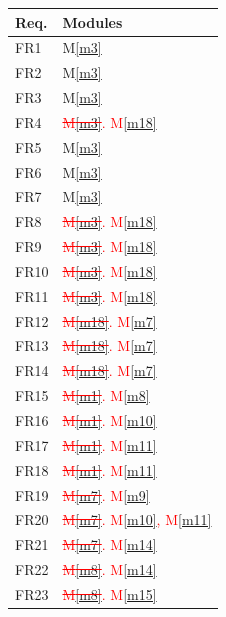 \documentclass[12pt, titlepage]{article}
\newcommand{\mref}[1]{M\ref{#1}}
\begin{document}
\begin{table}[H]
	\centering
	\begin{tabular}{p{} p{}}
		\toprule
		\textbf{Req.} & \textbf{Modules}\\
		\midrule
		FR1 & \mref{m3}\\
		FR2 & \mref{m3}\\
		FR3 & \mref{m3}\\
		FR4 & \textcolor{red}{\sout{\mref{m3}}}\textcolor{red}{. \mref{m18}}\\
		FR5 & \mref{m3}\\
		FR6 & \mref{m3}\\
		FR7 & \mref{m3}\\
		FR8 & \textcolor{red}{\sout{\mref{m3}}}\textcolor{red}{. \mref{m18}}\\
		FR9 & \textcolor{red}{\sout{\mref{m3}}}\textcolor{red}{. \mref{m18}}\\
		FR10 & \textcolor{red}{\sout{\mref{m3}}}\textcolor{red}{. \mref{m18}}\\
		FR11 & \textcolor{red}{\sout{\mref{m3}}}\textcolor{red}{. \mref{m18}}\\
		FR12 & \textcolor{red}{\sout{\mref{m18}}}\textcolor{red}{. \mref{m7}}\\
		FR13 & \textcolor{red}{\sout{\mref{m18}}}\textcolor{red}{. \mref{m7}}\\
		FR14 & \textcolor{red}{\sout{\mref{m18}}}\textcolor{red}{. \mref{m7}}\\
		FR15 & \textcolor{red}{\sout{\mref{m1}}}\textcolor{red}{. \mref{m8}}\\
		FR16 & \textcolor{red}{\sout{\mref{m1}}}\textcolor{red}{. \mref{m10}}\\
		FR17 & \textcolor{red}{\sout{\mref{m1}}}\textcolor{red}{. \mref{m11}}\\
		FR18 & \textcolor{red}{\sout{\mref{m1}}}\textcolor{red}{. \mref{m11}}\\
		FR19 & \textcolor{red}{\sout{\mref{m7}}}\textcolor{red}{. \mref{m9}}\\
		FR20 & \textcolor{red}{\sout{\mref{m7}}}\textcolor{red}{. \mref{m10}, \mref{m11}}\\
		FR21 & \textcolor{red}{\sout{\mref{m7}}}\textcolor{red}{. \mref{m14}}\\
		FR22 & \textcolor{red}{\sout{\mref{m8}}}\textcolor{red}{. \mref{m14}}\\
		FR23 & \textcolor{red}{\sout{\mref{m8}}}\textcolor{red}{. \mref{m15}}\\

\end{tabular}
\end{table}
\end{document}
